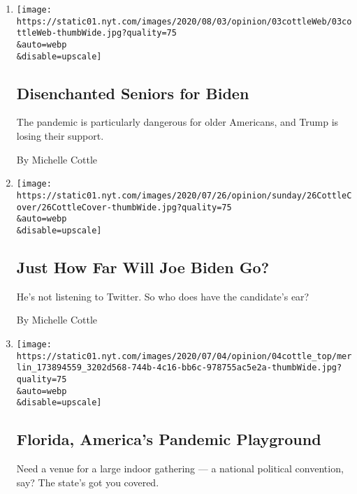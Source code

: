 \begin{enumerate}
\def\labelenumi{\arabic{enumi}.}
\item
  \href{/2020/08/03/opinion/senior-voters-biden-trump-2020.html}{}

  \texttt{[image: https://static01.nyt.com/images/2020/08/03/opinion/03cottleWeb/03cottleWeb-thumbWide.jpg?quality=75\\\&auto=webp\\\&disable=upscale]}

  \hypertarget{disenchanted-seniors-for-biden}{%
  \subsection{Disenchanted Seniors for
  Biden}\label{disenchanted-seniors-for-biden}}

  The pandemic is particularly dangerous for older Americans, and Trump
  is losing their support.

  By Michelle Cottle
\item
  \href{/2020/07/24/opinion/sunday/joe-biden-2020.html}{}

  \texttt{[image: https://static01.nyt.com/images/2020/07/26/opinion/sunday/26CottleCover/26CottleCover-thumbWide.jpg?quality=75\\\&auto=webp\\\&disable=upscale]}

  \hypertarget{just-how-far-will-joe-biden-go}{%
  \subsection{Just How Far Will Joe Biden
  Go?}\label{just-how-far-will-joe-biden-go}}

  He's not listening to Twitter. So who does have the candidate's ear?

  By Michelle Cottle
\item
  \href{/2020/07/02/opinion/coronavirus-florida-reopenings.html}{}

  \texttt{[image: https://static01.nyt.com/images/2020/07/04/opinion/04cottle\_top/merlin\_173894559\_3202d568-744b-4c16-bb6c-978755ac5e2a-thumbWide.jpg?quality=75\\\&auto=webp\\\&disable=upscale]}

  \hypertarget{florida-americas-pandemic-playground}{%
  \subsection{Florida, America's Pandemic
  Playground}\label{florida-americas-pandemic-playground}}

  Need a venue for a large indoor gathering --- a national political
  convention, say? The state's got you covered.


\end{enumerate}
